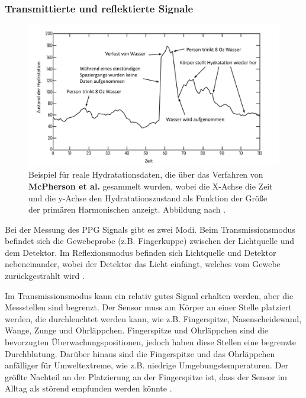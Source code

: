 \documentclass[10pt,a4paper,headinclude,twoside, plainheadsepline, open=right, numbers=noenddot, twocolumn]{article}
\begin{document}
\subsubsection{Transmittierte und reflektierte Signale}
\label{transmittierte und reflektierte signale}

\begin{figure}[ht]
	\centering
	\includegraphics[width=\linewidth]{images/hydratationsdaten.pdf}
	\caption{Beispiel für reale Hydratationsdaten, die über das Verfahren von \textbf{McPherson et al.} gesammelt wurden, wobei die X-Achse die Zeit und die y-Achse den Hydratationszustand als Funktion der Größe der primären Harmonischen anzeigt. Abbildung nach \cite{mcpherson2015systems}.}
	\label{hydratationszustand}
\end{figure}

Bei der Messung des PPG Signals gibt es zwei Modi.
Beim Transmissionsmodus befindet sich die Gewebeprobe (z.B. Fingerkuppe) zwischen der Lichtquelle und dem Detektor.
Im Reflexionsmodus befinden sich Lichtquelle und Detektor nebeneinander, wobei der Detektor das Licht einfängt, welches vom Gewebe zurückgestrahlt wird \cite{john2007photopletysmography}.

Im Transmissionsmodus kann ein relativ gutes Signal erhalten werden, aber die Messstellen sind begrenzt.
Der Sensor muss am Körper an einer Stelle platziert werden, die durchleuchtet werden kann, wie z.B. Fingerspitze, Nasenscheidewand, Wange, Zunge und Ohrläppchen.
Fingerspitze und Ohrläppchen sind die bevorzugten Überwachungspositionen, jedoch haben diese Stellen eine begrenzte Durchblutung.
Darüber hinaus sind die Fingerspitze und das Ohrläppchen anfälliger für Umweltextreme, wie z.B. niedrige Umgebungstemperaturen.
Der größte Nachteil an der Platzierung an der Fingerspitze ist, dass der Sensor im Alltag als störend empfunden werden könnte \cite{tamura2014wearable}.
\end{document}
